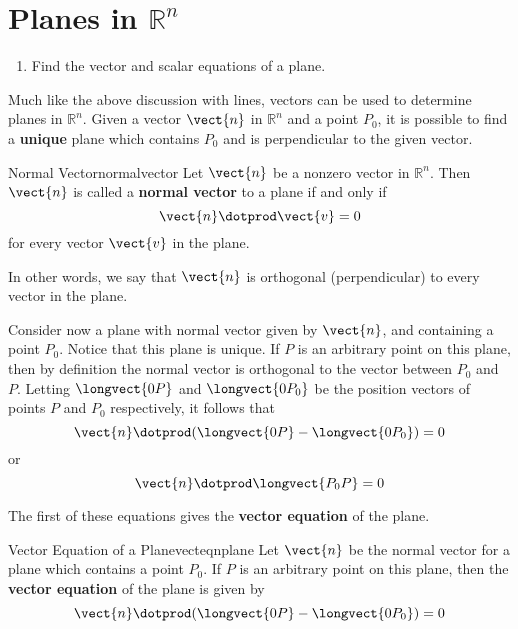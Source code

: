\pagebreak
\section{Planes in $\mathbb{R}^n$}

\begin{outcome}

\begin{enumerate}

\item[A.] Find the vector and scalar equations of a plane.

\end{enumerate}
\end{outcome}

Much like the above discussion with lines, vectors can be used to determine planes in $\mathbb{R}^n$. Given a vector $\vect{n}$ in $\mathbb{R}^n$ and a point $P_0$, it is possible to find a \textbf{unique} plane which contains $P_0$ and is perpendicular to the given vector. 

\begin{definition}{Normal Vector}{normalvector}
Let $\vect{n}$ be a nonzero vector in $\mathbb{R}^n$. Then $\vect{n}$ is called a \textbf{normal vector} to a plane if and only if 
\[
\vect{n} \dotprod \vect{v} = 0
\]
for every vector $\vect{v}$ in the plane. 
\end{definition}

In other words, we say that $\vect{n}$ is orthogonal (perpendicular) to every vector in the plane. 

Consider now a plane with normal vector given by $\vect{n}$, and containing a point $P_0$. Notice that this plane is unique. If $P$ is an arbitrary point on this plane, then by definition the normal vector is orthogonal to the vector between $P_0$ and $P$. Letting $\longvect{0P}$ and $\longvect{0P_0}$ be the position vectors of points $P$ and $P_0$ respectively, it follows that 
\[
\vect{n} \dotprod (\longvect{0P} - \longvect{0P_0}) = 0 
\]
or
\[
\vect{n} \dotprod \longvect{P_0P} = 0 
\]

The first of these equations gives the \textbf{vector equation} of the plane. 

\begin{definition}{Vector Equation of a Plane}{vecteqnplane}
Let $\vect{n}$ be the normal vector for a plane which contains a point $P_0$. If $P$ is an arbitrary point on this plane, then the  \textbf{vector equation} of the plane is given by 
\[
\vect{n} \dotprod (\longvect{0P} - \longvect{0P_0}) = 0
\]
\end{definition}

